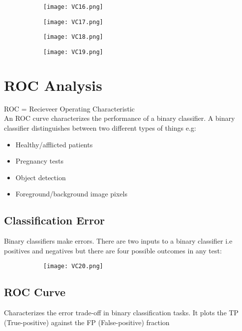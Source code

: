 \documentclass[8pt]{extreport}
\begin{document}
\begin{figure}[H]
\centering
\begin{subfigure}[b]{0.3\linewidth}
\texttt{[image: VC16.png]}
\end{subfigure}
\begin{subfigure}[b]{0.3\linewidth}
\texttt{[image: VC17.png]}
\end{subfigure}
\begin{subfigure}[b]{0.3\linewidth}
\texttt{[image: VC18.png]}
\end{subfigure}
\begin{subfigure}[b]{0.3\linewidth}
\texttt{[image: VC19.png]}
\end{subfigure}
\end{figure}

\section{ROC Analysis}

ROC = Recieveer Operating Characteristic\\

An ROC curve characterizes the performance of a binary classifier. A binary classifier distinguishes between two different types of things e.g:
\begin{itemize}
\item Healthy/afflicted patients 
\item Pregnancy tests
\item Object detection
\item Foreground/background image pixels
\end{itemize}

\subsection{Classification Error}
Binary classifiers make errors. There are two inputs to a binary classifier i.e positives and negatives but there are four possible outcomes in any test:
\begin{figure}[H]
\centering
\begin{subfigure}[b]{0.5\linewidth}
\texttt{[image: VC20.png]}
\end{subfigure}
\end{figure}

\subsection{ROC Curve}
Characterizes the error trade-off in binary classification tasks. It plots the TP (True-positive) against the FP (False-positive) fraction
\end{document}
